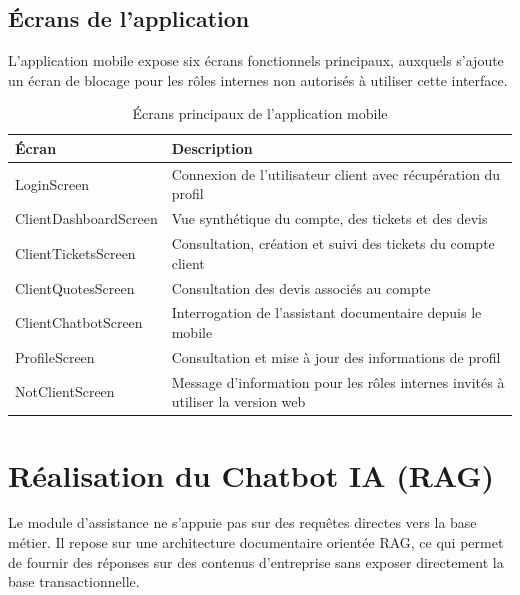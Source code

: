 \subsection{Écrans de l'application}
L'application mobile expose six écrans fonctionnels principaux, auxquels s'ajoute un écran de blocage pour les rôles internes non autorisés à utiliser cette interface.

\begin{table}[H]
\centering
\caption{Écrans principaux de l'application mobile}
\label{tab:mobile_screens}
\begin{tabularx}{\textwidth}{|l|X|}
\hline
\textbf{Écran} & \textbf{Description} \\
\hline
LoginScreen & Connexion de l'utilisateur client avec récupération du profil \\
\hline
ClientDashboardScreen & Vue synthétique du compte, des tickets et des devis \\
\hline
ClientTicketsScreen & Consultation, création et suivi des tickets du compte client \\
\hline
ClientQuotesScreen & Consultation des devis associés au compte \\
\hline
ClientChatbotScreen & Interrogation de l'assistant documentaire depuis le mobile \\
\hline
ProfileScreen & Consultation et mise à jour des informations de profil \\
\hline
NotClientScreen & Message d'information pour les rôles internes invités à utiliser la version web \\
\hline
\end{tabularx}
\end{table}


\section{Réalisation du Chatbot IA (RAG)}
Le module d'assistance ne s'appuie pas sur des requêtes directes vers la base métier. Il repose sur une architecture documentaire orientée RAG, ce qui permet de fournir des réponses sur des contenus d'entreprise sans exposer directement la base transactionnelle.

